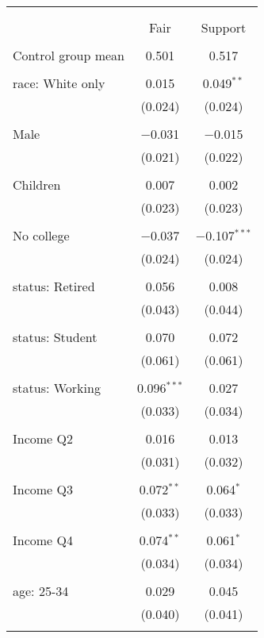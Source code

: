 
\begin{tabular}{@{\extracolsep{5pt}}lcc} 
\\[-1.8ex]\hline 
\hline \\[-1.8ex] 
\\[-1.8ex] & Fair & Support \\ 
\hline \\[-1.8ex] 
 Control group mean & 0.501 & 0.517  \\ \hline \\[-1.8ex] race: White only & 0.015 & 0.049$^{**}$ \\ 
  & (0.024) & (0.024) \\ 
  & & \\ 
 Male & $-$0.031 & $-$0.015 \\ 
  & (0.021) & (0.022) \\ 
  & & \\ 
 Children & 0.007 & 0.002 \\ 
  & (0.023) & (0.023) \\ 
  & & \\ 
 No college & $-$0.037 & $-$0.107$^{***}$ \\ 
  & (0.024) & (0.024) \\ 
  & & \\ 
 status: Retired & 0.056 & 0.008 \\ 
  & (0.043) & (0.044) \\ 
  & & \\ 
 status: Student & 0.070 & 0.072 \\ 
  & (0.061) & (0.061) \\ 
  & & \\ 
 status: Working & 0.096$^{***}$ & 0.027 \\ 
  & (0.033) & (0.034) \\ 
  & & \\ 
 Income Q2 & 0.016 & 0.013 \\ 
  & (0.031) & (0.032) \\ 
  & & \\ 
 Income Q3 & 0.072$^{**}$ & 0.064$^{*}$ \\ 
  & (0.033) & (0.033) \\ 
  & & \\ 
 Income Q4 & 0.074$^{**}$ & 0.061$^{*}$ \\ 
  & (0.034) & (0.034) \\ 
  & & \\ 
 age: 25-34 & 0.029 & 0.045 \\ 
  & (0.040) & (0.041) \\ 
  & & \\ 

\end{tabular}
